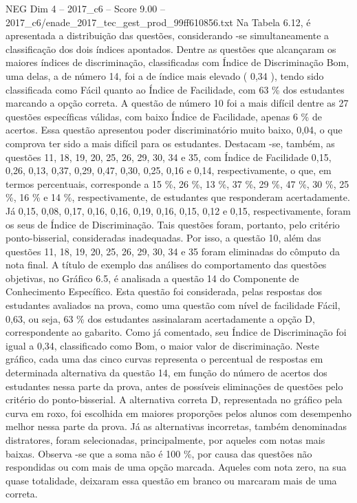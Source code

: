 \begin{textsample}{NEG Dim 4 – 2017\_c6 – Score 9.00 – 2017\_c6/enade\_2017\_tec\_gest\_prod\_99ff610856.txt}
Na Tabela 6.12, é apresentada a distribuição das questões, considerando -se simultaneamente a classificação dos dois índices apontados.
Dentre as questões que alcançaram os maiores índices de discriminação, classificadas com Índice de Discriminação Bom, uma delas, a de número 14, foi a de índice mais elevado ( 0,34 ), tendo sido classificada como Fácil quanto ao Índice de Facilidade, com 63 \% dos estudantes marcando a opção correta.
A questão de número 10 foi a mais difícil dentre as 27 questões específicas válidas, com baixo Índice de Facilidade, apenas 6 \% de acertos.
Essa questão apresentou poder discriminatório muito baixo, 0,04, o que comprova ter sido a mais difícil para os estudantes.
Destacam -se, também, as questões 11, 18, 19, 20, 25, 26, 29, 30, 34 e 35, com Índice de Facilidade 0,15, 0,26, 0,13, 0,37, 0,29, 0,47, 0,30, 0,25, 0,16 e 0,14, respectivamente, o que, em termos percentuais, corresponde a 15 \%, 26 \%, 13 \%, 37 \%, 29 \%, 47 \%, 30 \%, 25 \%, 16 \% e 14 \%, respectivamente, de estudantes que responderam acertadamente.
Já 0,15, 0,08, 0,17, 0,16, 0,16, 0,19, 0,16, 0,15, 0,12 e 0,15, respectivamente, foram os seus de Índice de Discriminação.
Tais questões foram, portanto, pelo critério ponto-bisserial, consideradas inadequadas.
Por isso, a questão 10, além das questões 11, 18, 19, 20, 25, 26, 29, 30, 34 e 35 foram eliminadas do cômputo da nota final.
A título de exemplo das análises do comportamento das questões objetivas, no Gráfico 6.5, é analisada a questão 14 do Componente de Conhecimento Específico.
Esta questão foi considerada, pelas respostas dos estudantes avaliados na prova, como uma questão com nível de facilidade Fácil, 0,63, ou seja, 63 \% dos estudantes assinalaram acertadamente a opção D, correspondente ao gabarito.
Como já comentado, seu Índice de Discriminação foi igual a 0,34, classificado como Bom, o maior valor de discriminação.
Neste gráfico, cada uma das cinco curvas representa o percentual de respostas em determinada alternativa da questão 14, em função do número de acertos dos estudantes nessa parte da prova, antes de possíveis eliminações de questões pelo critério do ponto-bisserial.
A alternativa correta D, representada no gráfico pela curva em roxo, foi escolhida em maiores proporções pelos alunos com desempenho melhor nessa parte da prova.
Já as alternativas incorretas, também denominadas distratores, foram selecionadas, principalmente, por aqueles com notas mais baixas.
Observa -se que a soma não é 100 \%, por causa das questões não respondidas ou com mais de uma opção marcada.
Aqueles com nota zero, na sua quase totalidade, deixaram essa questão em branco ou marcaram mais de uma correta.

\end{textsample}
